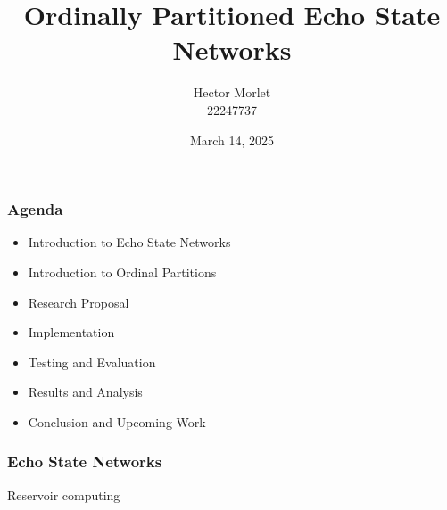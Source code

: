 \documentclass{beamer}
\title{Ordinally Partitioned Echo State Networks}%
\author{Hector Morlet\\22247737}
\date{March 14, 2025}
\begin{document}
\frame{\titlepage} %

\begin{frame}
    \frametitle{Agenda}
    \begin{itemize}
        \item Introduction to Echo State Networks
        \item Introduction to Ordinal Partitions
        \item Research Proposal
        \item Implementation
        \item Testing and Evaluation
        \item Results and Analysis
        \item Conclusion and Upcoming Work
    \end{itemize}
\end{frame}

\begin{frame}
    \frametitle{Echo State Networks}

    Reservoir computing
\end{frame}
\end{document}
